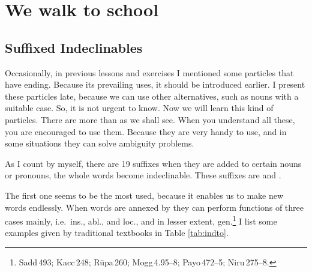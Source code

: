 \chapter{We  walk  to school }\label{chap:ind-to}

{}
\section*{Suffixed Indeclinables}

Occasionally, in previous lessons and exercises I mentioned some particles that have  ending. Because its prevailing uses, it should be introduced earlier. I present these particles late, because we can use other alternatives, such as nouns with a suitable case. So, it is not urgent to know. Now we will learn this kind of particles. There are more than  as we shall see. When you understand all these, you are encouraged to use them. Because they are very handy to use, and in some situations they can solve ambiguity problems.

As I count by myself, there are 19 suffixes when they are added to certain nouns or pronouns, the whole words become indeclinable. These suffixes are  and .

The first one seems to be the most used, because it enables us to make new words endlessly. When words are annexed by  they can perform functions of three cases mainly, i.e.\ ins., abl., and loc., and in lesser extent, gen.\footnote{Sadd\,493; Kacc\,248; R\=upa\,260; Mogg\,4.95--8; Payo\,472--5; Niru\,275--8.} I list some examples given by traditional textbooks in Table \ref{tab:indto}.

